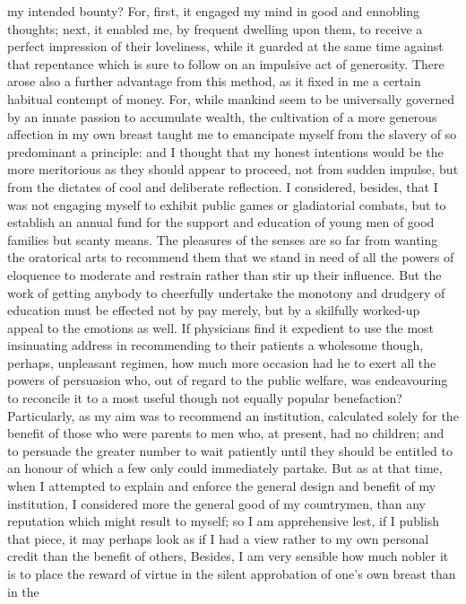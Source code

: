 my intended bounty? For, first, it engaged my mind in good and ennobling
thoughts; next, it enabled me, by frequent dwelling upon them, to receive
a perfect impression of their loveliness, while it guarded at the same
time against that repentance which is sure to follow on an impulsive act
of generosity. There arose also a further advantage from this method, as
it fixed in me a certain habitual contempt of money. For, while mankind
seem to be universally governed by an innate passion to accumulate wealth,
the cultivation of a more generous affection in my own breast taught me to
emancipate myself from the slavery of so predominant a principle: and I
thought that my honest intentions would be the more meritorious as they
should appear to proceed, not from sudden impulse, but from the dictates
of cool and deliberate reflection. I considered, besides, that I was not
engaging myself to exhibit public games or gladiatorial combats, but to
establish an annual fund for the support and education of young men of
good families but scanty means. The pleasures of the senses are so far
from wanting the oratorical arts to recommend them that we stand in need
of all the powers of eloquence to moderate and restrain rather than stir
up their influence. But the work of getting anybody to cheerfully
undertake the monotony and drudgery of education must be effected not by
pay merely, but by a skilfully worked-up appeal to the emotions as well.
If physicians find it expedient to use the most insinuating address in
recommending to their patients a wholesome though, perhaps, unpleasant
regimen, how much more occasion had he to exert all the powers of
persuasion who, out of regard to the public welfare, was endeavouring to
reconcile it to a most useful though not equally popular benefaction?
Particularly, as my aim was to recommend an institution, calculated solely
for the benefit of those who were parents to men who, at present, had no
children; and to persuade the greater number to wait patiently until they
should be entitled to an honour of which a few only could immediately
partake. But as at that time, when I attempted to explain and enforce the
general design and benefit of my institution, I considered more the
general good of my countrymen, than any reputation which might result to
myself; so I am apprehensive lest, if I publish that piece, it may perhaps
look as if I had a view rather to my own personal credit than the benefit
of others, Besides, I am very sensible how much nobler it is to place the
reward of virtue in the silent approbation of one's own breast than in the
